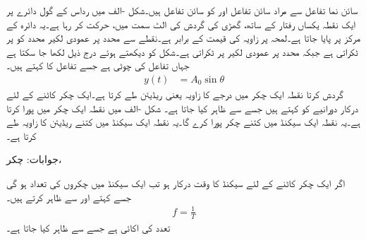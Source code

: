 
سائن نما تفاعل سے مراد سائن تفاعل  اور کو سائن تفاعل  ہیں۔شکل -الف میں رداس  کے گول دائرے پر ایک نقطہ یکساں رفتار کے ساتھ، گھڑی کی گردش کی الٹ سمت میں، حرکت کر رہا ہے۔یہ دائرہ  کے مرکز  پر پایا جاتا ہے۔لمحہ  پر زاویہ  کی قیمت  کے برابر ہے۔نقطے سے  محدد پر عمودی لکیر محدد کو    پر ٹکراتی ہے جبکہ  محدد پر عمودی لکیر  پر ٹکراتی ہے۔شکل کو دیکھتے ہوئے درج ذیل لکھا جا سکتا ہے جہاں  تفاعل کی چوٹی ہے جسے تفاعل کا  کہتے ہیں۔
\begin{align}\label{مساوات_بدلتا_سائن_نما_تفاعل_الف}
y(t)&=A_0 \sin \theta
\end{align}
 گردش کرتا نقطہ ایک چکر میں  درجے کا زاویہ یعنی  ریڈیئن طے کرتا ہے۔ایک چکر کاٹنے کے لئے درکار دورانیے کو  کہتے ہیں جسے  سے ظاہر کیا جاتا ہے۔
شکل -الف میں نقطہ ایک چکر  میں پورا کرتا ہے۔یہ نقطہ ایک سیکنڈ میں کتنے چکر پورا کرے گا۔یہ نقطہ ایک سیکنڈ میں کتنے ریڈیئن کا زاویہ طے کرتا ہے۔

جوابات: چکر، 

اگر ایک چکر کاٹنے کے لئے  سیکنڈ کا وقت درکار ہو تب ایک سیکنڈ میں چکروں کی تعداد   ہو گی جسے  کہتے اور  سے ظاہر کرتے ہیں۔
\begin{align}
f=\frac{1}{T}
\end{align}
تعدد کی اکائی  ہے جسے  سے ظاہر کیا جاتا ہے۔

